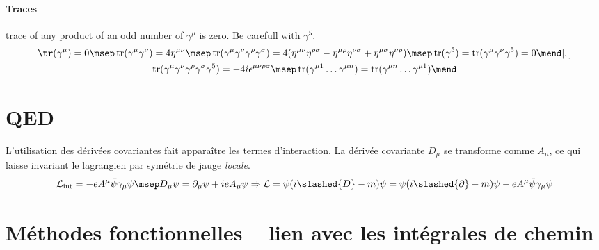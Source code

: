 \documentclass{article}
\begin{document}
\paragraph{Traces} trace of any product of an odd number of $\gamma^\mu$ is zero. Be carefull with $\gamma^5$.
\begin{gather*}
\tr(\gamma ^{\mu })=0
\msep
\operatorname {tr} (\gamma ^{\mu }\gamma ^{\nu })=4\eta ^{\mu \nu }
\msep
\operatorname {tr} (\gamma ^{\mu }\gamma ^{\nu }\gamma ^{\rho }\gamma ^{\sigma })=4(\eta ^{\mu \nu }\eta ^{\rho \sigma }-\eta ^{\mu \rho }\eta ^{\nu \sigma }+\eta ^{\mu \sigma }\eta ^{\nu \rho })
\msep
\operatorname {tr} (\gamma ^{5})=\operatorname {tr} (\gamma ^{\mu }\gamma ^{\nu }\gamma ^{5})=0
\mend[,]\\
{\displaystyle \operatorname {tr} (\gamma ^{\mu }\gamma ^{\nu }\gamma ^{\rho }\gamma ^{\sigma }\gamma ^{5})=-4i\epsilon ^{\mu \nu \rho \sigma }}
\msep
\operatorname {tr} (\gamma ^{\mu 1}\dots \gamma ^{\mu n})=\operatorname {tr} (\gamma ^{\mu n}\dots \gamma ^{\mu 1})
\mend
\end{gather*}

\section{QED}
L'utilisation des dérivées covariantes fait apparaître les termes d'interaction. La dérivée covariante $D_\mu$ se transforme comme $A_\mu$, ce qui laisse invariant le lagrangien par symétrie de jauge \emph{locale}.
\begin{gather*}
\mathcal{L}_\text{int} = -eA^\mu\bar{\psi}\gamma_\mu\psi
\msep
D_\mu\psi = \partial_\mu\psi + ieA_\mu\psi
\Rightarrow
\mathcal{L} = \psi(i\slashed{D}-m)\psi = \psi(i\slashed{\partial}-m)\psi -eA^\mu\bar{\psi}\gamma_\mu\psi
\end{gather*}

\section{Méthodes fonctionnelles -- lien avec les intégrales de chemin}
\end{document}
